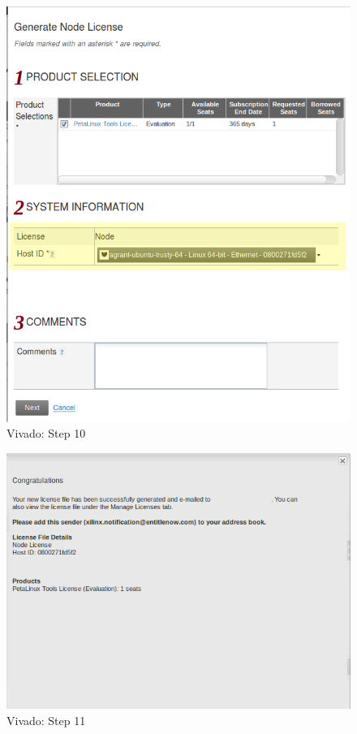 \begin{figure}
    \centering
    \includegraphics[width=1\textwidth,trim={0 8cm 0 8cm},clip]{images/devguide/vivado-install-14.png}
    \caption[Vivado: Step 10]{%
        Vivado: Step 10
    }
    \label{fig:devguide:vivado10}
\end{figure}

\begin{figure}
    \centering
    \includegraphics[width=1\textwidth,trim={0 8cm 0 0cm},clip]{images/devguide/vivado-install-16.png}
    \caption[Vivado: Step 11]{%
        Vivado: Step 11
    }
    \label{fig:devguide:vivado11}
\end{figure}

